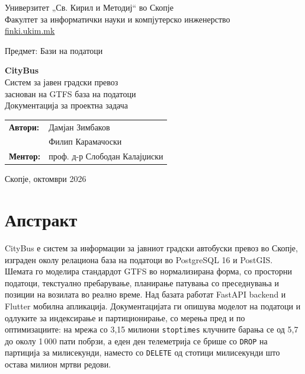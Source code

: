 \documentclass[11pt, a4paper]{article}
\renewcommand{\_}{\oldunderscore\allowbreak}
\newcommand{\code}[1]{\texttt{#1}}
\begin{document}
\begin{titlepage}
    \centering
    \vspace*{1cm}

    {\large Универзитет „Св. Кирил и Методиј“ во Скопје \\[0.3cm]}
    {\large Факултет за информатички науки и компјутерско инженерство \\[0.15cm]}
    {\normalsize \href{https://finki.ukim.mk}{finki.ukim.mk} \\[2.2cm]}

    {\large Предмет: Бази на податоци \\[2cm]}

    {\Huge \textbf{CityBus} \\[0.4cm]}
    {\Large Систем за јавен градски превоз\\ заснован на GTFS база на податоци \\[0.5cm]}
    {\large Документација за проектна задача \\[3cm]}

    \begin{flushleft}
        \begin{tabular}{ll}
            \textbf{Автори:} & Дамјан Зимбаков \\
                             & Филип Карамачоски \\[0.3cm]
            \textbf{Ментор:} & проф. д-р Слободан Калајџиски \\
        \end{tabular}
    \end{flushleft}

    \vfill
    {\large Скопје, октомври 2026}
\end{titlepage}

\tableofcontents

\section*{Апстракт}

CityBus е систем за информации за јавниот градски автобуски превоз во Скопје, изграден околу релациона база на податоци во PostgreSQL 16 и PostGIS. Шемата го моделира стандардот GTFS во нормализирана форма, со просторни податоци, текстуално пребарување, планирање патувања со преседнувања и позиции на возилата во реално време. Над базата работат FastAPI backend и Flutter мобилна апликација. Документацијата ги опишува моделот на податоци и одлуките за индексирање и партиционирање, со мерења пред и по оптимизациите: на мрежа со 3,15 милиони \code{stop\_times} клучните барања се од 5,7 до околу 1\,000 пати побрзи, а еден ден телеметрија се брише со \code{DROP} на партиција за милисекунди, наместо со \code{DELETE} од стотици милисекунди што остава милион мртви редови.
\end{document}
